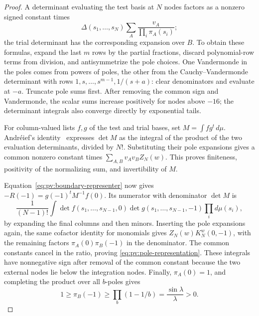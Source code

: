 \begin{proof}
A determinant evaluating the test basis at \(N\) nodes factors as a nonzero signed constant times
\[
 \Delta(s_1,\ldots,s_N)\sum_A\frac{v_A}{\prod_i\pi_A(s_i)};
\]
the trial determinant has the corresponding expansion over \(B\). To obtain these formulas, expand the last \(m\) rows by the partial fractions, discard polynomial-row terms from division, and antisymmetrize the pole choices. One Vandermonde in the poles comes from powers of poles, the other from the Cauchy--Vandermonde determinant with rows \(1,s,\ldots,s^{m-1},1/(s+a)\): clear denominators and evaluate at \(-a\). Truncate pole sums first. After removing the common sign and Vandermonde, the scalar sums increase positively for nodes above \(-16\); the determinant integrals also converge directly by exponential tails.

For column-valued lists \(f,g\) of the test and trial bases, set \(M=\int fg^t\,d\mu\). Andr\'eief's identity~\cite[Eq.~(1.3)]{TracyWidom1998} expresses \(\det M\) as the integral of the product of the two evaluation determinants, divided by \(N!\). Substituting their pole expansions gives a common nonzero constant times \(\sum_{A,B}v_Av_BZ_N(w)\). This proves finiteness, positivity of the normalizing sum, and invertibility of \(M\).

Equation~\eqref{eq:pv:boundary-representer} now gives \(-R(-1)=g(-1)^tM^{-1}f(0)\). Its numerator with denominator \(\det M\) is
\[
 \frac1{(N-1)!}\int
 \det f(s_1,\ldots,s_{N-1},0)
 \det g(s_1,\ldots,s_{N-1},-1)\prod_i d\mu(s_i),
\]
by expanding the final columns and then minors. Inserting the pole expansions again, the same cofactor identity for monomials gives \(Z_N(w)K_N^w(0,-1)\), with the remaining factors \(\pi_A(0)\pi_B(-1)\) in the denominator. The common constants cancel in the ratio, proving \eqref{eq:pv:pole-representation}. These integrals have nonnegative sign after removal of the common constant because the two external nodes lie below the integration nodes. Finally, \(\pi_A(0)=1\), and completing the product over all \(b\)-poles gives
\[
 1\ge\pi_B(-1)\ge\prod_b(1-1/b)=\frac{\sin\lambda}{\lambda}>0.
\]
\end{proof}

